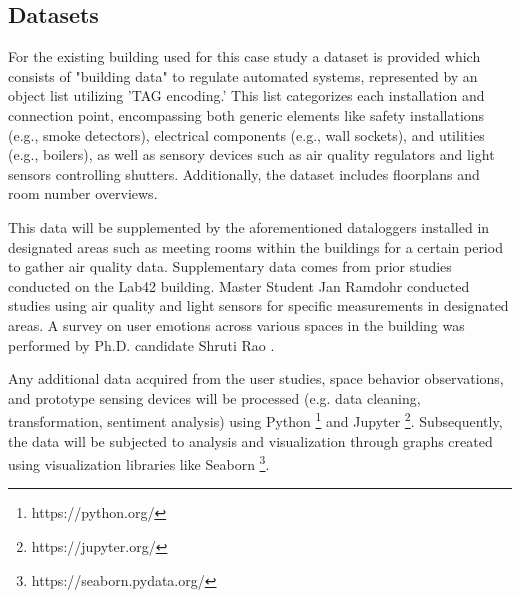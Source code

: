 \subsection{Datasets}
For the existing building used for this case study a dataset is provided which consists of "building data" to regulate automated systems, represented by an object list utilizing 'TAG encoding.' This list categorizes each installation and connection point, encompassing both generic elements like safety installations (e.g., smoke detectors), electrical components (e.g., wall sockets), and utilities (e.g., boilers), as well as sensory devices such as air quality regulators and light sensors controlling shutters. Additionally, the dataset includes floorplans and room number overviews. 

This data will be supplemented by the aforementioned dataloggers installed in designated areas such as meeting rooms within the buildings for a certain period to gather air quality data. Supplementary data comes from prior studies conducted on the Lab42 building. Master Student Jan Ramdohr conducted studies using air quality and light sensors for specific measurements in designated areas\cite{sensing}. A survey on user emotions across various spaces in the building was performed by Ph.D. candidate Shruti Rao \cite{emotion}.

Any additional data acquired from the user studies, space behavior observations, and prototype sensing devices will be processed (e.g. data cleaning, transformation, sentiment analysis) using Python \footnote{https://python.org/} and Jupyter \footnote{https://jupyter.org/}. Subsequently, the data will be subjected to analysis and visualization through graphs created using visualization libraries like Seaborn \footnote{https://seaborn.pydata.org/}.
